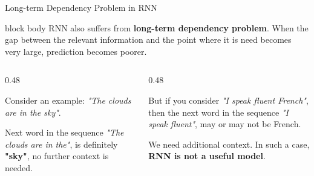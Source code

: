 \documentclass[aspectratio=169,xcolor=dvipsnames,svgnames,x11names,fleqn]{beamer}
\begin{document}
\begin{frame}[fragile]{Long-term Dependency Problem in RNN}
    \small
    \begin{beamercolorbox}[wd=\textwidth, sep=6pt, rounded=true]{block body}
         RNN also suffers from \textbf{long-term dependency problem}. When the gap between the relevant information and the point where it is need becomes very large, prediction becomes poorer.
    \end{beamercolorbox}

    \vspace{10pt}

    \begin{columns}[T]
        \begin{column}{0.48\textwidth}
            \begin{tcolorbox}[colback=dependencyCharcoal!5, colframe=dependencyCharcoal, arc=1mm, title=\scriptsize Short Gap (Success), fonttitle=\bfseries]
                \footnotesize
                Consider an example: \textit{"The clouds are in the sky"}. 
                \vspace{5pt}
                
                Next word in the sequence \textit{"The clouds are in the"}, is definitely \textbf{"sky"}, no further context is needed.
            \end{tcolorbox}
        \end{column}

        \begin{column}{0.48\textwidth}
            \begin{tcolorbox}[colback=dependencyAmber!5, colframe=dependencyAmber, arc=1mm, title=\scriptsize Long Gap (Problem), fonttitle=\bfseries]
                \footnotesize
                But if you consider \textit{"I speak fluent French"}, then the next word in the sequence \textit{"I speak fluent"}, may or may not be French. 

                \vspace{5pt}
                
                We need additional context. In such a case, \textbf{RNN is not a useful model}.
            \end{tcolorbox}
        \end{column}
    \end{columns}

    \vspace{10pt}
    
    \centering
\end{frame}
\end{document}

